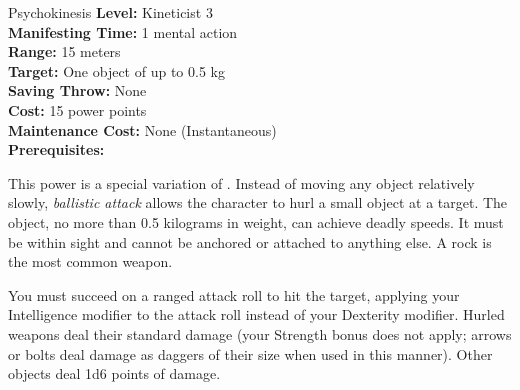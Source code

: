 {Psychokinesis}
{
	\textbf{Level:}
	Kineticist 3\\
	\textbf{Manifesting Time:}
	1 mental action\\
	\textbf{Range:}
	15 meters\\
	\textbf{Target:}
	One object of up to 0.5 kg\\
	\textbf{Saving Throw:}
	None\\
	\textbf{Cost:}
	15 power points\\
	\textbf{Maintenance Cost:}
	None (Instantaneous)\\
	\textbf{Prerequisites:}
	\\
}
{
	This power is a special variation of . Instead of moving any object relatively slowly, \emph{ballistic attack} allows the character to hurl a small object at a target. The object, no more than 0.5 kilograms in weight, can achieve deadly speeds. It must be within sight and cannot be anchored or attached to anything else. A rock is the most common weapon.

	You must succeed on a ranged attack roll to hit the target, applying your Intelligence modifier to the attack roll instead of your Dexterity modifier. Hurled weapons deal their standard damage (your Strength bonus does not apply; arrows or bolts deal damage as daggers of their size when used in this manner). Other objects deal 1d6 points of damage.
}